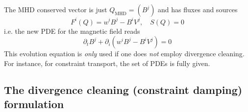 \documentclass[a4paper]{article}
\newcommand{\mhd}{\text{MHD}}
\begin{document}
The MHD conserved vector is just $Q_\mhd=(B^j)$ and has fluxes and sources
\begin{equation}
F^i(Q) = w^i B^j - B^i V^j,
\quad S(Q) = 0
\end{equation}
i.e. the new PDE for the magnetic field reads
\begin{equation}\label{eq.grmhd.pdeb.simple}
\partial_t B^j + \partial_i (w^i B^j - B^i V^j) = 0
\end{equation}
This evolution equation is \emph{only} used if one does \emph{not} employ
divergence cleaning. For instance, for constraint transport, the set
of PDEs is fully given.

%
%

\subsection{The divergence cleaning (constraint damping) formulation}
\end{document}
